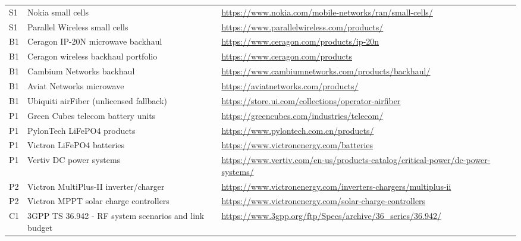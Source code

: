 \documentclass[9pt,a4paper]{extarticle}
\newcommand{\ulinkurl}[1]{#1}
\begin{document}
{\begin{longtable}{@{}p{0.65cm}p{4.4cm}p{9.7cm}@{}}
S1 & Nokia small cells & \href{https://www.nokia.com/mobile-networks/ran/small-cells/}{\ulinkurl{https://www.nokia.com/mobile-networks/ran/small-cells/}} \\
S1 & Parallel Wireless small cells & \href{https://www.parallelwireless.com/products/}{\ulinkurl{https://www.parallelwireless.com/products/}} \\
B1 & Ceragon IP-20N microwave backhaul & \href{https://www.ceragon.com/products/ip-20n}{\ulinkurl{https://www.ceragon.com/products/ip-20n}} \\
B1 & Ceragon wireless backhaul portfolio & \href{https://www.ceragon.com/products}{\ulinkurl{https://www.ceragon.com/products}} \\
B1 & Cambium Networks backhaul & \href{https://www.cambiumnetworks.com/products/backhaul/}{\ulinkurl{https://www.cambiumnetworks.com/products/backhaul/}} \\
B1 & Aviat Networks microwave & \href{https://aviatnetworks.com/products/}{\ulinkurl{https://aviatnetworks.com/products/}} \\
B1 & Ubiquiti airFiber (unlicensed fallback) & \href{https://store.ui.com/collections/operator-airfiber}{\ulinkurl{https://store.ui.com/collections/operator-airfiber}} \\
P1 & Green Cubes telecom battery units & \href{https://greencubes.com/industries/telecom/}{\ulinkurl{https://greencubes.com/industries/telecom/}} \\
P1 & PylonTech LiFePO4 products & \href{https://www.pylontech.com.cn/products/}{\ulinkurl{https://www.pylontech.com.cn/products/}} \\
P1 & Victron LiFePO4 batteries & \href{https://www.victronenergy.com/batteries}{\ulinkurl{https://www.victronenergy.com/batteries}} \\
P1 & Vertiv DC power systems & \href{https://www.vertiv.com/en-us/products-catalog/critical-power/dc-power-systems/}{\ulinkurl{https://www.vertiv.com/en-us/products-catalog/critical-power/dc-power-systems/}} \\
P2 & Victron MultiPlus-II inverter/charger & \href{https://www.victronenergy.com/inverters-chargers/multiplus-ii}{\ulinkurl{https://www.victronenergy.com/inverters-chargers/multiplus-ii}} \\
P2 & Victron MPPT solar charge controllers & \href{https://www.victronenergy.com/solar-charge-controllers}{\ulinkurl{https://www.victronenergy.com/solar-charge-controllers}} \\
C1 & 3GPP TS 36.942 - RF system scenarios and link budget & \href{https://www.3gpp.org/ftp/Specs/archive/36_series/36.942/}{\ulinkurl{https://www.3gpp.org/ftp/Specs/archive/36\_series/36.942/}} \\

\end{longtable}}
\end{document}
